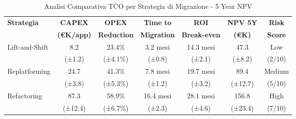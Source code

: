 \documentclass[12pt,a4paper]{article}
\begin{document}
\begin{table}[htbp]
\centering
\caption{Analisi Comparativa TCO per Strategia di Migrazione - 5 Year NPV}
\label{tab:tco-migrazione}
\begin{tabular}{@{}lcccccc@{}}
\toprule
\textbf{Strategia} & \textbf{CAPEX} & \textbf{OPEX} & \textbf{Time to} & \textbf{ROI} & \textbf{NPV 5Y} & \textbf{Risk} \\
 & \textbf{(€K/app)} & \textbf{Reduction} & \textbf{Migration} & \textbf{Break-even} & \textbf{(€K)} & \textbf{Score} \\
\midrule
\multirow{2}{*}{Lift-and-Shift} & 8.2 & 23.4\% & 3.2 mesi & 14.3 mesi & 47.3 & Low \\
 & (±1.2) & (±4.1\%) & (±0.8) & (±2.1) & (±8.2) & (2/10) \\
\midrule
\multirow{2}{*}{Replatforming} & 24.7 & 41.3\% & 7.8 mesi & 19.7 mesi & 89.4 & Medium \\
 & (±3.8) & (±5.3\%) & (±1.2) & (±3.2) & (±12.7) & (5/10) \\
\midrule
\multirow{2}{*}{Refactoring} & 87.3 & 58.9\% & 16.4 mesi & 28.1 mesi & 156.8 & High \\
 & (±12.4) & (±6.7\%) & (±2.3) & (±4.6) & (±23.4) & (7/10) \\
\bottomrule
\end{tabular}
\end{table}

\end{document}
